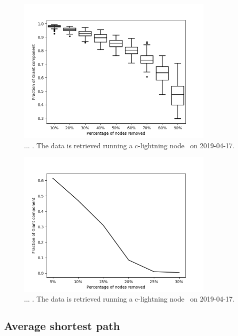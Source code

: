 \vspace*{-0.45cm}
\begin{figure}[!htb]
	\hspace*{-1cm} 
	\centering
	\includegraphics[width=9.5cm]{images/robustness_accidental.png}
	\caption{... . The data is retrieved running a c-lightning node~\cite{repository:clightning} on 2019-04-17.
	}
	\label{fig:accidental_failure}
	\hspace*{2mm} 
\end{figure}
\vspace*{-1.1cm}
\begin{figure}[!htb]
	\hspace*{-1cm} 
	\centering
	\includegraphics[width=9.5cm]{images/robustness_coordinated_mait.png}
	\caption{... . The data is retrieved running a c-lightning node~\cite{repository:clightning} on 2019-04-17.
	}
	\label{fig:coordinated_attack}
	\hspace*{2mm}
\end{figure}
\vspace*{-0.45cm}

\subsection{Average shortest path}

